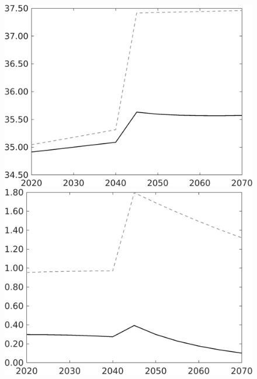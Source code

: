 \begin{figure}[h!!]
\begin{minipage}[]{0.32\textwidth}
		\includegraphics[width=1\textwidth]{../../codding_model/own_basedOnFried/optimalPol_010922_revision/figures/all_13Sept22/CompTaufPER_bytaul_KN_Reg0_gAf_spillover0_nsk0_xgr0_knspil0_sep0_LFlimit1_emsbase0_countec0_GovRev0_etaa0.79_lgd0.png} 
	\end{minipage}	
	\begin{minipage}[]{0.32\textwidth}
		\includegraphics[width=1\textwidth]{../../codding_model/own_basedOnFried/optimalPol_010922_revision/figures/all_13Sept22/CompTaufPER_bytaul_KN_Reg0_gAn_spillover0_nsk0_xgr0_knspil0_sep0_LFlimit1_emsbase0_countec0_GovRev0_etaa0.79_lgd0.png} \end{minipage}	

\end{figure}
